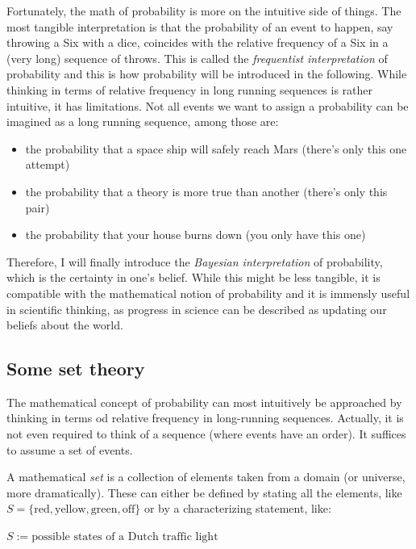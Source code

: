 \documentclass[]{svmono}
\providecommand{\tightlist}{%
  \setlength{\itemsep}{0pt}\setlength{\parskip}{0pt}}
\begin{document}
Fortunately, the math of probability is more on the intuitive side of
things. The most tangible interpretation is that the probability of an
event to happen, say throwing a Six with a dice, coincides with the
relative frequency of a Six in a (very long) sequence of throws. This is
called the \emph{frequentist interpretation} of probability and this is
how probability will be introduced in the following. While thinking in
terms of relative frequency in long running sequences is rather
intuitive, it has limitations. Not all events we want to assign a
probability can be imagined as a long running sequence, among those are:

\begin{itemize}
\tightlist
\item
  the probability that a space ship will safely reach Mars (there's only
  this one attempt)
\item
  the probability that a theory is more true than another (there's only
  this pair)
\item
  the probability that your house burns down (you only have this one)
\end{itemize}

Therefore, I will finally introduce the \emph{Bayesian interpretation}
of probability, which is the certainty in one's belief. While this might
be less tangible, it is compatible with the mathematical notion of
probability and it is immensly useful in scientific thinking, as
progress in science can be described as updating our beliefs about the
world.

\subsection{Some set theory}\label{some-set-theory}

The mathematical concept of probability can most intuitively be
approached by thinking in terms od relative frequency in long-running
sequences. Actually, it is not even required to think of a sequence
(where events have an order). It suffices to assume a set of events.

A mathematical \emph{set} is a collection of elements taken from a
domain (or universe, more dramatically). These can either be defined by
stating all the elements, like
\(S = \{\textrm{red}, \textrm{yellow}, \textrm{green}, \textrm{off}\}\)
or by a characterizing statement, like:

\(S := \textrm{possible states of a Dutch traffic light}\)
\end{document}
